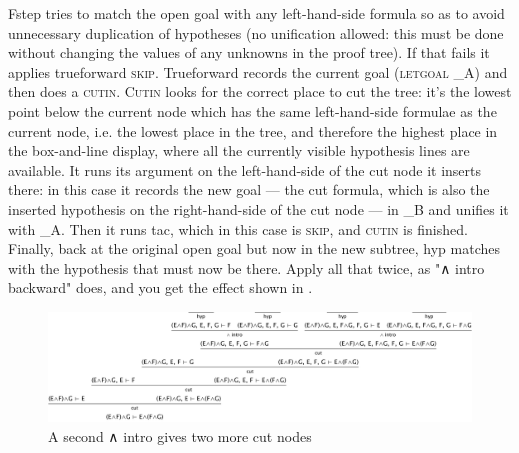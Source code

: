 Fstep tries to match the open goal with any left-hand-side formula so as to avoid unnecessary duplication of hypotheses (no unification allowed: this must be done without changing the values of any unknowns in the proof tree). If that fails it applies trueforward \textsc{skip}. Trueforward records the current goal (\textsc{letgoal} \_A) and then does a \textsc{cutin}. \textsc{Cutin} looks for the correct place to cut the tree: it's the lowest point below the current node which has the same left-hand-side formulae as the current node, i.e. the lowest place in the tree, and therefore the highest place in the box-and-line display, where all the currently visible hypothesis lines are available. It runs its argument on the left-hand-side of the cut node it inserts there: in this case it records the new goal --- the cut formula, which is also the inserted hypothesis on the right-hand-side of the cut node --- in \_B and unifies it with \_A. Then it runs tac, which in this case is \textsc{skip}, and \textsc{cutin} is finished. Finally, back at the original open goal but now in the new subtree, hyp matches with the hypothesis that must now be there. Apply all that twice, as "∧ intro backward" does, and you get the effect shown in .

\begin{figure}
\centering
\includegraphics[scale=0.35]{pics/I2L/andcutintree2}
\caption{A second ∧ intro gives two more cut nodes}
\label{fig:I2L:andcutintree2}
\end{figure}

